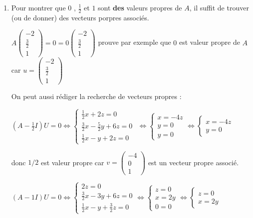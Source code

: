 \documentclass[a4paper, 11pt,reqno]{article}
\begin{document}
\begin{enumerate}
\item Pour montrer que 0 , $\displaystyle
\frac{1}{2}$ et $1$ sont \textbf{des} valeurs propres de $A$, il suffit de
trouver (ou de donner) des vecteurs porpres associ\'{e}s.

$A\left( 
\begin{array}{c}
-2 \\ 
\frac{3}{2} \\ 
1%
\end{array}
\right) =0=0\left( 
\begin{array}{c}
-2 \\ 
\frac{3}{2} \\ 
1%
\end{array}
\right) $ prouve par exemple que $0$ est valeur propre de $A$ car $u=\left( 
\begin{array}{c}
-2 \\ 
\frac{3}{2} \\ 
1%
\end{array}
\right) $

On peut aussi r\'{e}diger la recherche de vecteurs propres :

$\displaystyle
\left( A-\frac{1}{2}I\right) U=0\Leftrightarrow \left\{ 
\begin{array}{c}
\frac{1}{2}x+2z=0 \\ 
\frac{3}{2}x-\frac{5}{2}y+6z=0 \\ 
\frac{1}{2}x-y+2z=0%
\end{array}
\right. $ $\Leftrightarrow \left\{ 
\begin{array}{c}
x=-4z \\ 
y=0 \\ 
y=0%
\end{array}
\right. \Leftrightarrow \left\{ 
\begin{array}{c}
x=-4z \\ 
y=0%
\end{array}
\right. $

donc $1/2$ est valeur propre car $v=\left( 
\begin{array}{c}
-4 \\ 
0 \\ 
1%
\end{array}
\right) $ est un vecteur propre associ\'{e}.

$\left( A-1I\right) U=0\Leftrightarrow \left\{ 
\begin{array}{c}
2z=0 \\ 
\frac{3}{2}x-3y+6z=0 \\ 
\frac{1}{2}x-y+\frac{3}{2}z=0%
\end{array}
\right. \Leftrightarrow \left\{ 
\begin{array}{c}
z=0 \\ 
x=2y \\ 
0=0%
\end{array}
\right. \Leftrightarrow \left\{ 
\begin{array}{c}
z=0 \\ 
x=2y%
\end{array}
\right. $


\end{enumerate}
\end{document}
